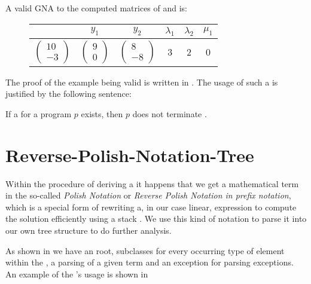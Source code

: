 \begin{example}
	A valid GNA to the computed matrices of  and  is:\newline
	\begin{figure}[H]
		\centering
		\begin{tabular}{|c|c|c|c|c|c|}
			\hline
			\stem & $y_1$ & $y_2$ & $\lambda_1$ & $\lambda_2$ & $\mu_1$ \\ \hline
			$\begin{pmatrix} 10 \\ -3 \end{pmatrix}$ & $\begin{pmatrix} 9 \\ 0 \end{pmatrix}$ & $\begin{pmatrix} 8 \\ -8 \end{pmatrix}$ & 3 & 2 & 0 \\ \hline
		\end{tabular}
	\end{figure}
\end{example}
The proof of the example being valid is written in .
The usage of such a \gna is justified by the following sentence:
\begin{satz}
	\label{sen:gna-nonterm}
	If a \gna for a program $p$ exists, then $p$ does not terminate \cite{leike2014geometric}.
\end{satz}

\section{Reverse-Polish-Notation-Tree}
\label{sec:rpntree}
Within the procedure of deriving a \gna it happens that we get a mathematical term in the so-called \textit{Polish Notation} or \textit{Reverse Polish Notation in prefix notation}, which is a special form of rewriting a, in our case linear, expression to compute the solution efficiently using a stack \cite{wikirpn}. We use this kind of notation to parse it into our own tree structure to do further analysis.

As shown in  we have an  root, subclasses for every occurring type of element within the \its, a  parsing of a given term and an exception for parsing exceptions.
An example of the \rpntree's usage is shown in 

